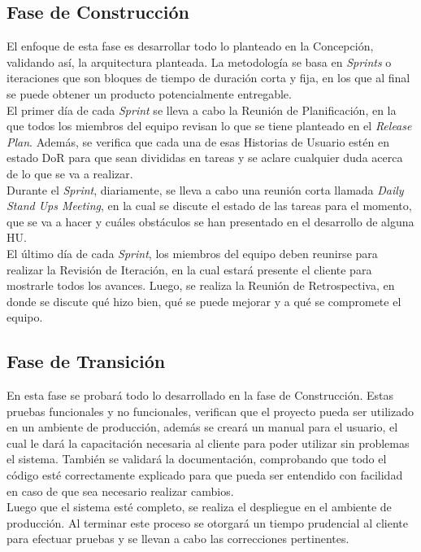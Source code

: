 \subsection{Fase de Construcción}

El enfoque de esta fase es desarrollar todo lo planteado en la Concepción, validando así, la arquitectura planteada. La metodología se basa en \textit{Sprints} o iteraciones que son bloques de tiempo de duración corta y fija, en los que al final se puede obtener un producto potencialmente entregable. \\

El primer día de cada \textit{Sprint} se lleva a cabo la Reunión de Planificación, en la que todos los miembros del equipo revisan lo que se tiene planteado en el \textit{Release Plan}. Además, se verifica que cada una de esas Historias de Usuario estén en estado DoR para que sean divididas en tareas y se aclare cualquier duda acerca de lo que se va a realizar. \\

Durante el \textit{Sprint}, diariamente, se lleva a cabo una reunión corta llamada \textit{Daily Stand Ups Meeting}, en la cual se discute el estado de las tareas para el momento, que se va a hacer y cuáles obstáculos se han presentado en el desarrollo de alguna HU.\\

El último día de cada \textit{Sprint}, los miembros del equipo deben reunirse para realizar la Revisión de Iteración, en la cual estará presente el cliente para mostrarle todos los avances. Luego, se realiza la Reunión de Retrospectiva, en donde se discute qué hizo bien, qué se puede mejorar y a qué se compromete el equipo.

\subsection{Fase de Transición}

En esta fase se probará todo lo desarrollado en la fase de Construcción. Estas pruebas funcionales y no funcionales, verifican que el proyecto pueda ser utilizado en un ambiente de producción, además se creará un manual para el usuario, el cual le dará la capacitación necesaria al cliente para poder utilizar sin problemas el sistema. También se validará la documentación, comprobando que todo el código esté correctamente explicado para que pueda ser entendido con facilidad en caso de que sea necesario realizar cambios.\\

Luego que el sistema esté completo, se realiza el despliegue en el ambiente de producción. Al terminar este proceso se otorgará un tiempo prudencial al cliente para efectuar pruebas y se llevan a cabo las correcciones pertinentes.
